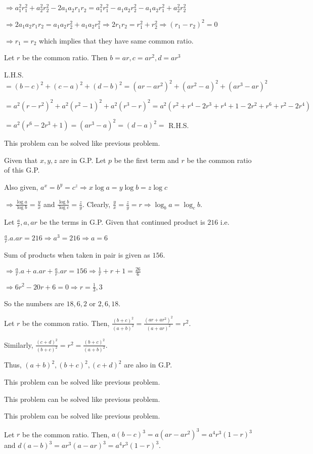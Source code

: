   $\Rightarrow a_1^2r_1^2 + a_2^2r_2^2 - 2a_1a_2r_1r_2 = a_1^2r_1^2 - a_1a_2r_2^2 - a_1a_2r_1^2 + a_2^2r_2^2$

  $\Rightarrow 2a_1a_2r_1r_2 = a_1a_2r_2^2 + a_1a_2r_1^2 \Rightarrow 2r_1r_2 = r_1^2 + r_2^2 \Rightarrow (r_1 - r_2)^2 = 0$

  $\Rightarrow r _1 = r_2$ which implies that they have same common ratio.
\item Let $r$ be the common ratio. Then $b = ar, c = ar^2, d = ar^3$

  L.H.S. $= (b - c)^2 + (c - a)^2 + (d - b)^2 = (ar - ar^2)^2 + (ar^2 - a)^2 + (ar^3 - ar)^2$

  $= a^2(r - r^2)^2 + a^2(r^2 - 1)^2 + a^2(r^3 - r)^2 = a^2(r^2 + r^4 - 2r^3 + r^4 + 1 - 2r^2 + r^6 + r^2 - 2r^4)$

  $= a^2(r^6 - 2r^3 + 1) = (ar^3 - a)^2 = (d - a)^2 = $ R.H.S.
\item This problem can be solved like previous problem.
\item Given that $x, y, z$ are in G.P. Let $p$ be the first term and $r$ be the common ratio of this G.P.

  Also given, $a^x = b^y = c^z \Rightarrow x\log a = y\log b = z\log c$

  $\Rightarrow \frac{\log a}{\log b} = \frac{y}{x}$ and $\frac{\log b}{\log c} = \frac{z}{y}$. Clearly, $\frac{y}{x} = \frac{z}{y} =
  r \Rightarrow \log_ba = \log_cb$.
\item Let $\frac{a}{r}, a, ar$ be the terms in G.P. Given that continued product is $216$ i.e.

  $\frac{a}{r}.a.ar = 216 \Rightarrow a^3 = 216 \Rightarrow a = 6$

  Sum of products when taken in pair is given as $156$.

  $\Rightarrow \frac{a}{r}.a + a.ar + \frac{a}{r}.ar = 156 \Rightarrow \frac{1}{r} + r + 1 = \frac{26}{6}$

  $\Rightarrow 6r^2 -20r + 6 = 0 \Rightarrow r = \frac{1}{3}, 3$

  So the numbers are $18, 6, 2$ or $2, 6, 18$.
\item Let $r$ be the common ratio. Then, $\frac{(b + c)^2}{(a + b)^2} = \frac{(ar + ar^2)^2}{(a + ar)^2} = r^2$.

  Similarly, $\frac{(c + d)^2}{(b + c)^2} = r^2 = \frac{(b + c)^2}{(a + b)^2}$.

  Thus, $(a + b)^2, (b + c)^2, (c + d)^2$ are also in G.P.
\item This problem can be solved like previous problem.
\item This problem can be solved like previous problem.
\item This problem can be solved like previous problem.
\item Let $r$ be the common ratio. Then, $a(b - c)^3 = a(ar - ar^2)^3 = a^4r^3(1 - r)^3$ and $d(a - b)^3 =
  ar^3(a - ar)^3 = a^4r^3(1 - r)^3$.

